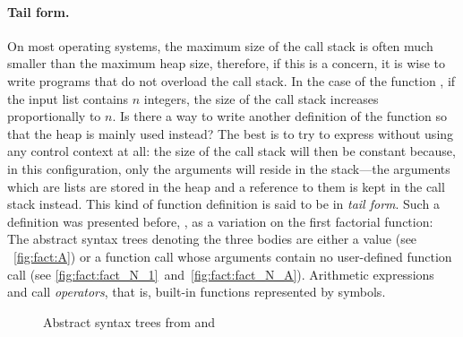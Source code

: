 \smallskip

\paragraph{Tail form.}

On most operating systems, the maximum size of the call stack is often
much smaller than the maximum heap size, therefore, if this is a
concern, it is wise to write programs that do not overload the call
stack. In the case of the function , if the input list
contains \(n\) integers, the size of the call stack increases
proportionally to \(n\). Is there a way to write another definition of
the function so that the heap is mainly used instead? The best is to
try to express  without using any control context at
all: the size of the call stack will then be constant because, in this
configuration, only the arguments will reside in the stack---the
arguments which are lists are stored in the heap and a reference to
them is kept in the call stack instead. This kind of function
definition is said to be in \emph{tail form}. Such a definition was
presented before, , as a variation on the
first factorial function:  The abstract
syntax trees denoting the three bodies are either a value (see
\fig~\vref{fig:fact:A}) or a function call whose arguments contain no
user\hyp{}defined function call (see \fig
\ref{fig:fact:fact_N_1}~and~\vref{fig:fact:fact_N_A}). Arithmetic
expressions  and  call \emph{operators},
that is, built\hyp{}in functions represented by symbols.
\begin{figure}[t]
\centering
{} \qquad
{}%
\quad
\caption{Abstract syntax trees from  and
  }
\end{figure}


